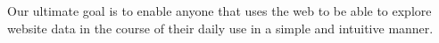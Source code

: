 \documentclass{vgtc}                          %
\begin{document}
Our ultimate goal is to enable anyone that uses the web to be able to explore website data in
the course of their daily use in a simple and intuitive manner.

%

%
%
%


\end{document}
